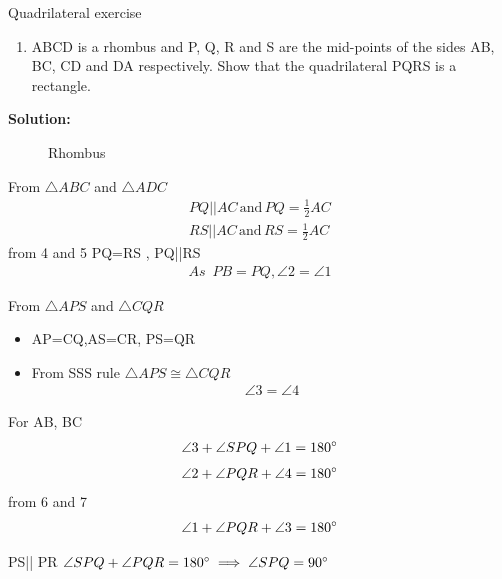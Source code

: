 \documentclass{beamer}
\newcounter{saveenumi}
\newcommand{\seti}{\setcounter{saveenumi}{\value{enumi}}}
\newcommand{\conti}{\setcounter{enumi}{\value{saveenumi}}}
\begin{document}
\begin{frame}{Quadrilateral exercise}
\begin{enumerate}
\conti
\item ABCD is a rhombus and P, Q, R and S are the
mid-points of the sides AB, BC, CD and DA
respectively. Show that the quadrilateral PQRS
is a rectangle.
\seti
\end{enumerate}
\textbf{Solution:}
\begin{figure}[!h]
\resizebox{0.3\linewidth}{!}
{

}
\caption{Rhombus}
\label{fig:foo}
\end{figure}
From $\triangle{ABC}$ and $\triangle{ADC}$
\begin{align}
PQ || AC \hspace{2pt}\text{and}\hspace{2pt} PQ=\frac{1}{2}AC\\
RS || AC \hspace{2pt}\text{and}\hspace{2pt} RS=\frac{1}{2}AC
\end{align}
from 4 and 5 PQ=RS , PQ||RS 
\begin{align}
 \textit{As}\hspace{6pt} PB=PQ, \angle{2} =\angle{1}
\end{align}
\end{frame}
\begin{frame}
From $\triangle{APS}$ and $\triangle{CQR}$ \\
\begin{itemize}
\item AP=CQ,AS=CR, PS=QR\\
\item From SSS rule
$\triangle{APS} \cong \triangle{CQR}$
\begin{align}
\angle{3} = \angle{4}
\end{align}
\end{itemize}
For AB, BC
\begin{align}
\angle{3}+\angle{SPQ}+\angle{1} = 180\degree
\end{align}
\begin{align*}
\angle{2}+\angle{PQR}+\angle{4}=180\degree
\end{align*}
from 6 and 7 
\begin{align}
\angle{1}+\angle{PQR}+\angle{3}=180\degree
\end{align}
\begin{center}
PS|| PR $\angle{SPQ}+\angle{PQR} =180\degree \implies \angle{SPQ}=90\degree$
\end{center}
\end{frame}
\end{document}
